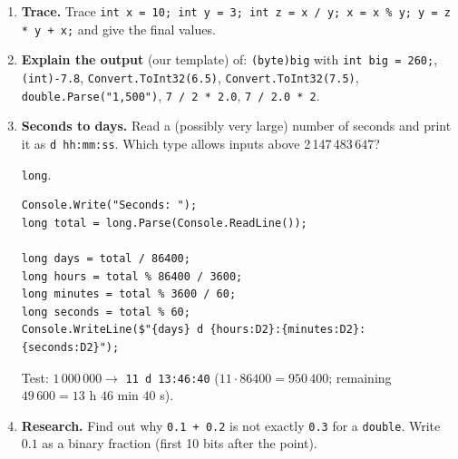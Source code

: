 \begin{enumerate}[label=\textbf{P\arabic*.},leftmargin=*,itemsep=1pt]
\begin{solbox}
\begin{lstlisting}[numbers=none]
int n100 = amount / 100;
int rest = amount % 100;
int n50 = rest / 50;
rest = rest % 50;
int n20 = rest / 20;
rest = rest % 20;
int n10 = rest / 10;
rest = rest % 10;
int n5 = rest / 5;
int n1 = rest % 5;

Console.WriteLine($"100:{n100} 50:{n50} 20:{n20} 10:{n10} 5:{n5} 1:{n1}");
\end{lstlisting}
 Test: $187 \to$ \texttt{100:1 50:1 20:1 10:1 5:1 1:2} ($100+50+20+10+5+2 = 187$).
\end{solbox}\fi
  \item {} \textbf{Trace.} Trace \texttt{int x = 10; int y = 3; int z = x / y; x = x \% y; y = z * y + x;} and give the final values.
  \item {} \textbf{Explain the output} (our template) of: \texttt{(byte)big} with \texttt{int big = 260;}, \texttt{(int)-7.8}, \texttt{Convert.ToInt32(6.5)}, \texttt{Convert.ToInt32(7.5)}, \texttt{double.Parse("1,500")}, \texttt{7 / 2 * 2.0}, \texttt{7 / 2.0 * 2}.
  \item {} \textbf{Seconds to days.} Read a (possibly very large) number of seconds and print it as \texttt{d hh:mm:ss}. Which type allows inputs above 2\,147\,483\,647?
  \ifsolutions\begin{solbox}\texttt{long}.
\begin{lstlisting}[numbers=none]
Console.Write("Seconds: ");
long total = long.Parse(Console.ReadLine());

long days = total / 86400;
long hours = total % 86400 / 3600;
long minutes = total % 3600 / 60;
long seconds = total % 60;
Console.WriteLine($"{days} d {hours:D2}:{minutes:D2}:{seconds:D2}");
\end{lstlisting}
 Test: $1\,000\,000 \to$ \texttt{11 d 13:46:40} ($11 \cdot 86400 = 950\,400$; remaining $49\,600 = 13$ h $46$ min $40$ s).
\end{solbox}\fi
  \item {} \textbf{Research.} Find out why \texttt{0.1 + 0.2} is not exactly \texttt{0.3} for a \texttt{double}. Write $0.1$ as a binary fraction (first 10 bits after the point).
\end{enumerate}

